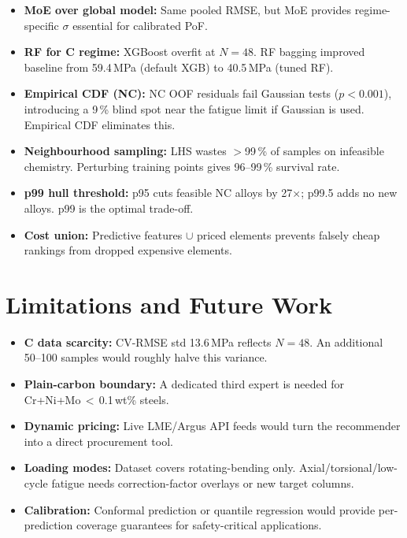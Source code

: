 \documentclass[10pt,a4paper]{article} %
\begin{document}
\begin{itemize}
  \item \textbf{MoE over global model:} Same pooled RMSE, but MoE provides regime-specific $\sigma$ essential for calibrated PoF.
  \item \textbf{RF for C regime:} XGBoost overfit at $N=48$. RF bagging improved baseline from 59.4\,MPa (default XGB) to 40.5\,MPa (tuned RF).
  \item \textbf{Empirical CDF (NC):} NC OOF residuals fail Gaussian tests ($p<0.001$), introducing a 9\,\% blind spot near the fatigue limit if Gaussian is used. Empirical CDF eliminates this.
  \item \textbf{Neighbourhood sampling:} LHS wastes $>$99\,\% of samples on infeasible chemistry. Perturbing training points gives 96--99\,\% survival rate.
  \item \textbf{p99 hull threshold:} p95 cuts feasible NC alloys by 27$\times$; p99.5 adds no new alloys. p99 is the optimal trade-off.
  \item \textbf{Cost union:} Predictive features $\cup$ priced elements prevents falsely cheap rankings from dropped expensive elements.
\end{itemize}

\section{Limitations and Future Work}

\begin{itemize}
  \item \textbf{C data scarcity:} CV-RMSE std 13.6\,MPa reflects $N=48$. An additional 50--100 samples would roughly halve this variance.
  \item \textbf{Plain-carbon boundary:} A dedicated third expert is needed for Cr+Ni+Mo\,$<$\,0.1\,wt\% steels.
  \item \textbf{Dynamic pricing:} Live LME/Argus API feeds would turn the recommender into a direct procurement tool.
  \item \textbf{Loading modes:} Dataset covers rotating-bending only. Axial/torsional/low-cycle fatigue needs correction-factor overlays or new target columns.
  \item \textbf{Calibration:} Conformal prediction or quantile regression would provide per-prediction coverage guarantees for safety-critical applications.
\end{itemize}
\end{document}
